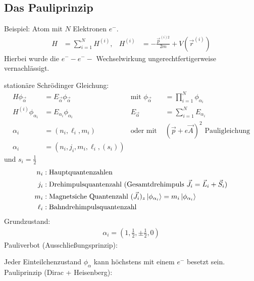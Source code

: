 \subsection{Das Pauliprinzip}
Beispiel: Atom mit $N$ Elektronen $e^-$.
	\begin{align*}
		H &= \sum_{i=1}^N H^{(i)} ,& 
		H^{(i)} &= - \frac{\vec{p}^{(i)2}}{2m} + V(\vec{r}^{(i)}) 
	\end{align*}
Hierbei wurde die $e^- -e^- -$ Wechselwirkung ungerechtfertigerweise vernachlässigt.
	
stationäre Schrödinger Gleichung:
	\begin{align*}
		H \phi_{\vec{\alpha}} &= E_{\vec{\alpha}} \phi_{\vec{\alpha}} 
		&\text{mit } \phi_{\vec{\alpha}} &= \prod_{i=1}^N \phi_{\alpha_i} \\
		H^{(i)} \phi_{\alpha_i} &= E_{\alpha_i} \phi_{\alpha_i} 
		&E_{\vec{\alpha}} &= \sum_{i=1}^N E_{\alpha_i} \\
		\alpha_i &= (n_i, \ell_i , m_i) 
		&\text{oder mit } &(\vec{p}+e \vec{A})^2 
		\text{ Pauligleichung} \\
		\alpha_i &= (n_i, j_i, m_i , \ell_i ,(s_i))
	\end{align*}
und $s_i = \frac{1}{2}$
	\begin{align*}
		n_i &: \text{Hauptquantenzahlen} \\
		j_i &: \text{Drehimpulsquantenzahl } ( \text{Gesamtdrehimpuls } \vec{J}_i = \vec{L}_i + \vec{S}_i) \\
		m_i &: \text{Magnetsiche Quantenzahl } (\vec{J}_i)_z \ket{\phi_{\alpha_i}} = m_i \ket{\phi_{\alpha_i}} \\
		\ell_i &: \text{Bahndrehimpulsquantenzahl}
	\end{align*}
Grundzustand:
	\begin{align*}
		\alpha_i = (1, \frac{1}{2}, \pm \frac{1}{2}, 0)
	\end{align*}
Pauliverbot (Ausschließungsprinzip):
		
Jeder Einteilchenzustand $\phi_\alpha$ kann höchstens mit einem $e^-$ besetzt sein. \\
Pauliprinzip (Dirac + Heisenberg):
		

